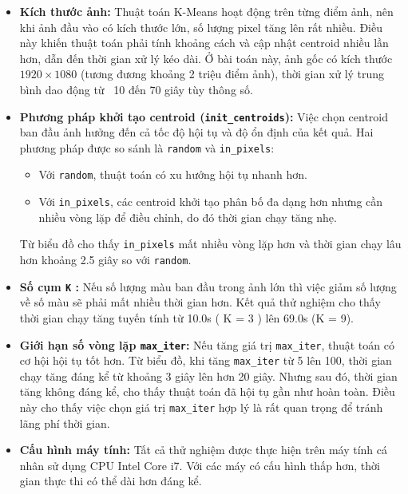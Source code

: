 \begin{itemize}
	\item \textbf{Kích thước ảnh:} Thuật toán K-Means hoạt động trên từng điểm ảnh, nên khi ảnh đầu vào có kích thước lớn, số lượng pixel tăng lên rất nhiều. Điều này khiến thuật toán phải tính khoảng cách và cập nhật centroid nhiều lần hơn, dẫn đến thời gian xử lý kéo dài. Ở bài toán này, ảnh gốc có kích thước $1920 \times 1080$ (tương đương khoảng 2 triệu điểm ảnh), thời gian xử lý trung bình dao động từ ~10 đến 70 giây tùy thông số.

	\item \textbf{Phương pháp khởi tạo centroid (\texttt{init\_centroids}):} Việc chọn centroid ban đầu ảnh hưởng đến cả tốc độ hội tụ và độ ổn định của kết quả. Hai phương pháp được so sánh là \texttt{random} và \texttt{in\_pixels}:
	      \begin{itemize}
		      \item Với \texttt{random}, thuật toán có xu hướng hội tụ nhanh hơn.
		      \item Với \texttt{in\_pixels}, các centroid khởi tạo phân bố đa dạng hơn nhưng cần nhiều vòng lặp để điều chỉnh, do đó thời gian chạy tăng nhẹ.
	      \end{itemize}
	      Từ biểu đồ cho thấy \texttt{in\_pixels} mất nhiều vòng lặp hơn và thời gian chạy lâu hơn khoảng 2.5 giây so với \texttt{random}.

	\item \textbf{Số cụm \texttt{K} :} Nếu số lượng màu ban đầu trong ảnh lớn thì việc giảm số lượng về số màu sẽ phải mất nhiều thời gian hơn. Kết quả thử nghiệm cho thấy thời gian chạy tăng tuyến tính từ 10.0s ( K = 3 ) lên 69.0s (K = 9).

	\item \textbf{Giới hạn số vòng lặp \texttt{max\_iter}:} Nếu tăng giá trị \texttt{max\_iter}, thuật toán có cơ hội hội tụ tốt hơn. Từ biểu đồ, khi tăng \texttt{max\_iter} từ 5 lên 100, thời gian chạy tăng đáng kể từ khoảng 3 giây lên hơn 20 giây. Nhưng sau đó, thời gian tăng không đáng kể, cho thấy thuật toán đã hội tụ gần như hoàn toàn. Điều này cho thấy việc chọn giá trị \texttt{max\_iter} hợp lý là rất quan trọng để tránh lãng phí thời gian.

	\item \textbf{Cấu hình máy tính:} Tất cả thử nghiệm được thực hiện trên máy tính cá nhân sử dụng CPU Intel Core i7. Với các máy có cấu hình thấp hơn, thời gian thực thi có thể dài hơn đáng kể.

\end{itemize}

